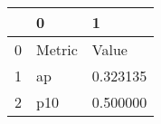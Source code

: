 \begin{tabular}{lll}
\toprule
 & 0 & 1 \\
\midrule
0 & Metric & Value \\
1 & ap & 0.323135 \\
2 & p10 & 0.500000 \\
\bottomrule
\end{tabular}
